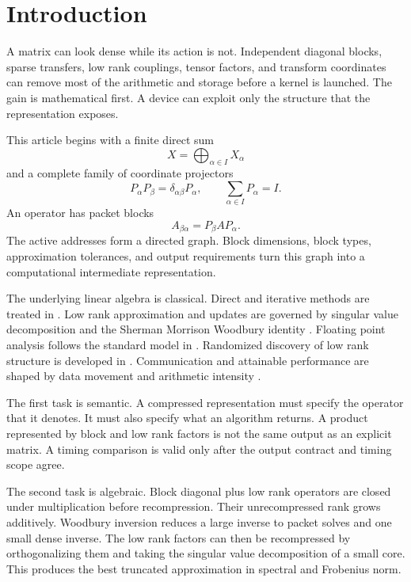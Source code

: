 \section{Introduction}\label{main:section:001}\label{sec:introduction}

A matrix can look dense while its action is not. Independent diagonal blocks, sparse transfers, low rank couplings, tensor factors, and transform coordinates can remove most of the arithmetic and storage before a kernel is launched. The gain is mathematical first. A device can exploit only the structure that the representation exposes.

This article begins with a finite direct sum
\[
X=\bigoplus_{\alpha\in I}X_\alpha
\]
and a complete family of coordinate projectors
\[
P_\alpha P_\beta=\delta_{\alpha\beta}P_\alpha,
\qquad
\sum_{\alpha\in I}P_\alpha=I.
\]
An operator has packet blocks
\[
A_{\beta\alpha}=P_\beta AP_\alpha.
\]
The active addresses form a directed graph. Block dimensions, block types, approximation tolerances, and output requirements turn this graph into a computational intermediate representation.

The underlying linear algebra is classical. Direct and iterative methods are treated in \cite{GolubVanLoan2013,Saad2003,Davis2006}. Low rank approximation and updates are governed by singular value decomposition and the Sherman Morrison Woodbury identity \cite{EckartYoung1936,Mirsky1960,Hager1989,BunchNielsen1978}. Floating point analysis follows the standard model in \cite{Higham2002,IEEE7542019}. Randomized discovery of low rank structure is developed in \cite{HalkoMartinssonTropp2011,MartinssonTropp2020}. Communication and attainable performance are shaped by data movement and arithmetic intensity \cite{HongKung1981,WilliamsWatermanPatterson2009,BallardDemmelHoltzSchwartz2011,FrigoLeisersonProkopRamachandran1999}.

The first task is semantic. A compressed representation must specify the operator that it denotes. It must also specify what an algorithm returns. A product represented by block and low rank factors is not the same output as an explicit matrix. A timing comparison is valid only after the output contract and timing scope agree.

The second task is algebraic. Block diagonal plus low rank operators are closed under multiplication before recompression. Their unrecompressed rank grows additively. Woodbury inversion reduces a large inverse to packet solves and one small dense inverse. The low rank factors can then be recompressed by orthogonalizing them and taking the singular value decomposition of a small core. This produces the best truncated approximation in spectral and Frobenius norm.

